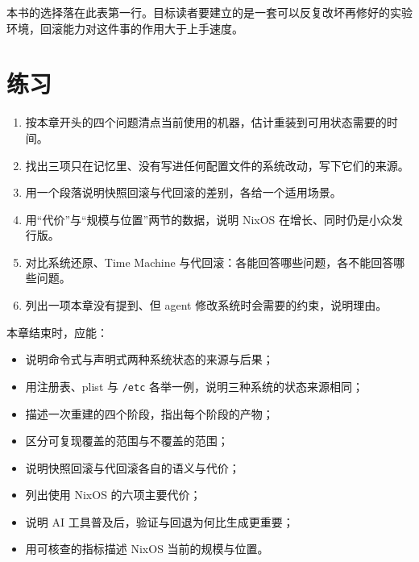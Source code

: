 本书的选择落在此表第一行。目标读者要建立的是一套可以反复改坏再修好的实验环境，回滚能力对这件事的作用大于上手速度。

\section{练习}

\begin{enumerate}
  \item 按本章开头的四个问题清点当前使用的机器，估计重装到可用状态需要的时间。
  \item 找出三项只在记忆里、没有写进任何配置文件的系统改动，写下它们的来源。
  \item 用一个段落说明快照回滚与代回滚的差别，各给一个适用场景。
  \item 用“代价”与“规模与位置”两节的数据，说明 NixOS 在增长、同时仍是小众发行版。
  \item 对比系统还原、Time Machine 与代回滚：各能回答哪些问题，各不能回答哪些问题。
  \item 列出一项本章没有提到、但 agent 修改系统时会需要的约束，说明理由。
\end{enumerate}

\begin{checkpoint}
本章结束时，应能：
\begin{itemize}
  \item 说明命令式与声明式两种系统状态的来源与后果；
  \item 用注册表、plist 与 \texttt{/etc} 各举一例，说明三种系统的状态来源相同；
  \item 描述一次重建的四个阶段，指出每个阶段的产物；
  \item 区分可复现覆盖的范围与不覆盖的范围；
  \item 说明快照回滚与代回滚各自的语义与代价；
  \item 列出使用 NixOS 的六项主要代价；
  \item 说明 AI 工具普及后，验证与回退为何比生成更重要；
  \item 用可核查的指标描述 NixOS 当前的规模与位置。
\end{itemize}
\end{checkpoint}
